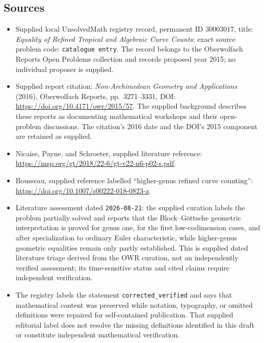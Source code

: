 \documentclass[11pt]{article}
\begin{document}
\subsection{Sources}
\begin{itemize}
\item Supplied local UnsolvedMath registry record, permanent ID \(30003017\), title: \emph{Equality of Refined Tropical and Algebraic Curve Counts}; exact source problem code: \texttt{catalogue entry}. The record belongs to the Oberwolfach Reports Open Problems collection and records proposed year 2015; no individual proposer is supplied.
\item Supplied report citation: \emph{Non-Archimedean Geometry and Applications} (2016), Oberwolfach Reports, pp.~3271--3331, DOI: \url{https://doi.org/10.4171/owr/2015/57}. The supplied background describes these reports as documenting mathematical workshops and their open-problem discussions. The citation's 2016 date and the DOI's 2015 component are retained as supplied.
\item Nicaise, Payne, and Schroeter, supplied literature reference: \url{https://msp.org/gt/2018/22-6/gt-v22-n6-p02-s.pdf}.
\item Bousseau, supplied reference labelled ``higher-genus refined curve counting'': \url{https://doi.org/10.1007/s00222-018-0823-z}.
\item Literature assessment dated \texttt{2026-08-21}: the supplied curation labels the problem partially solved and reports that the Block--G\"ottsche geometric interpretation is proved for genus one, for the first low-codimension cases, and after specialization to ordinary Euler characteristic, while higher-genus geometric equalities remain only partly established. This is supplied dated literature triage derived from the OWR curation, not an independently verified assessment; its time-sensitive status and cited claims require independent verification.
\item The registry labels the statement \texttt{corrected\_verified} and says that mathematical content was preserved while notation, typography, or omitted definitions were repaired for self-contained publication. That supplied editorial label does not resolve the missing definitions identified in this draft or constitute independent mathematical verification.
\end{itemize}
\end{document}
